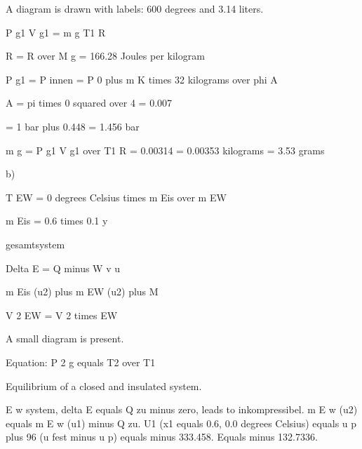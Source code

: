 A diagram is drawn with labels: 600 degrees and 3.14 liters.

P g1 V g1 = m g T1 R

R = R over M g = 166.28 Joules per kilogram

P g1 = P innen = P 0 plus m K times 32 kilograms over phi A

A = pi times 0 squared over 4 = 0.007

= 1 bar plus 0.448 = 1.456 bar

m g = P g1 V g1 over T1 R = 0.00314 = 0.00353 kilograms = 3.53 grams

b)

T EW = 0 degrees Celsius times m Eis over m EW

m Eis = 0.6 times 0.1 y

gesamtsystem

Delta E = Q minus W v u

m Eis (u2) plus m EW (u2) plus M

V 2 EW = V 2 times EW

A small diagram is present.

Equation: P 2 g equals T2 over T1

Equilibrium of a closed and insulated system.

E w system, delta E equals Q zu minus zero, leads to inkompressibel. m E w (u2) equals m E w (u1) minus Q zu. U1 (x1 equals 0.6, 0.0 degrees Celsius) equals u p plus 96 (u fest minus u p) equals minus 333.458. Equals minus 132.7336.